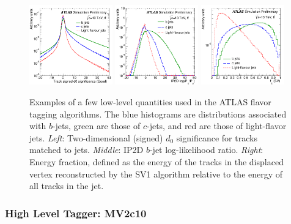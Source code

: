 \begin{figure}[!htb]
    \begin{center}
        \includegraphics[width=0.32\textwidth]{figures/chapter3/ftag/ftag_track_d0_sig_ip2d}
        \includegraphics[width=0.32\textwidth]{figures/chapter3/ftag/ftag_ip2d_pb}
        \includegraphics[width=0.32\textwidth]{figures/chapter3/ftag/ftag_sv1_fE}
        \caption{
            Examples of a few low-level quantities used in the ATLAS flavor tagging algorithms.
            The blue histograms are distributions associated with $b$-jets, green are those of $c$-jets, and red
            are those of light-flavor jets.
            \textit{Left}: Two-dimensional (signed) $d_0$ significance for tracks matched to jets.
            \textit{Middle}: IP2D $b$-jet log-likelihood ratio.
            \textit{Right}: Energy fraction, defined as the energy of the tracks in the displaced
                vertex reconstructed by the SV1 algorithm relative to the energy of all tracks in the jet.
        }
        \label{fig:ftag_low_level_var}
    \end{center}
\end{figure}

\subsubsection{High Level Tagger: MV2c10}
\label{sec:ftag_high_level}

